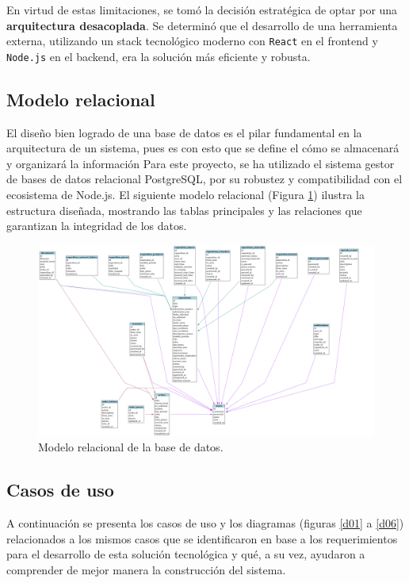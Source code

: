 \documentclass[12pt,letterpaper,spanish]{report}
\begin{document}
En virtud de estas limitaciones, se tomó la decisión estratégica de optar por una \textbf{arquitectura desacoplada}. Se determinó que el desarrollo de una herramienta externa, utilizando un stack tecnológico moderno con \texttt{React} en el frontend y \texttt{Node.js} en el backend, era la solución más eficiente y robusta. 




\subsection{Modelo relacional}
El diseño bien logrado de una base de datos es el pilar fundamental en la arquitectura de un sistema, pues es con esto que se define el cómo se almacenará y organizará la información Para este proyecto, se ha utilizado el sistema gestor de bases de datos relacional PostgreSQL, por su robustez y compatibilidad con el ecosistema de Node.js. El siguiente modelo relacional (Figura \ref{ER}) ilustra la estructura diseñada, mostrando las tablas principales y las relaciones que garantizan la integridad de los datos.
\begin{figure}[H]
  \centering
  \includegraphics[width=1.1\textwidth]{modelo_relacional.png}
  \caption{Modelo relacional de la base de datos.}\label{ER}
\end{figure} 
 
 \subsection{Casos de uso}
A continuación se presenta los casos de uso y los diagramas (figuras \ref{d01} a \ref{d06}) relacionados a los mismos casos que se identificaron en base a los requerimientos para el desarrollo de esta solución tecnológica y qué, a su vez, ayudaron a comprender de mejor manera la construcción del sistema. 
\end{document}
